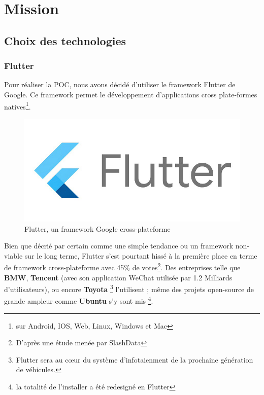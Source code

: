 \section{Mission}
\subsection{Choix des technologies}

\subsubsection*{Flutter}


Pour réaliser la POC, nous avons décidé d'utiliser le framework Flutter de Google\cite{Flutter}. Ce framework permet le développement d'applications cross plate-formes natives\footnote{sur Android, IOS, Web, Linux, Windows et Mac}.

\begin{figure}[h!]
    \centering
    \includegraphics[scale=0.5]{img/Flutter.jpg}
    \caption{Flutter, un framework Google cross-plateforme}
    \label{fig:Flutter logo}
\end{figure}

Bien que décrié par certain comme une simple tendance ou un framework non-viable sur le long terme, Flutter s'est pourtant hissé à la première place en terme de framework cross-plateforme avec 45\% de votes\footnote{D'après une étude menée par SlashData\cite{Flutter2.2}}. Des entreprises telle que \textbf{BMW}, \textbf{Tencent} (avec son application WeChat utilisée par 1.2 Milliards d'utilisateurs), ou encore \textbf{Toyota} \footnote{Flutter sera au cœur du système d'infotaienment de la prochaine génération de véhicules.} l'utilisent ; même des projets open-source de grande ampleur comme \textbf{Ubuntu} s'y sont mis \footnote{la totalité de l'installer a été redesigné en Flutter\cite{UbuntuFlutter}}.\\


